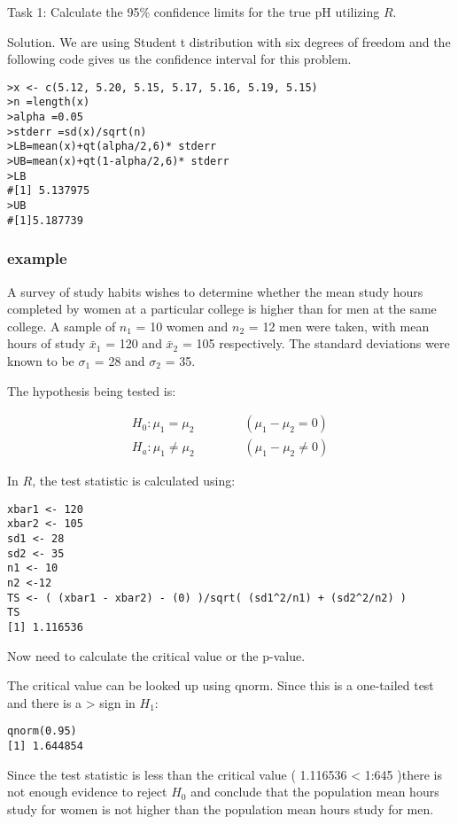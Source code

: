 Task 1: Calculate the 95\% confidence limits for the true pH
utilizing $R$.


Solution. We are using Student t distribution with six degrees of
freedom and the following code gives us the confidence interval
for this problem.
\begin{verbatim}
>x <- c(5.12, 5.20, 5.15, 5.17, 5.16, 5.19, 5.15)
>n =length(x)
>alpha =0.05
>stderr =sd(x)/sqrt(n)
>LB=mean(x)+qt(alpha/2,6)* stderr
>UB=mean(x)+qt(1-alpha/2,6)* stderr
>LB
#[1] 5.137975
>UB
#[1]5.187739
\end{verbatim}


\subsubsection{example}
A survey of study habits wishes to determine whether the mean
study hours completed by women at a particular college is higher
than for men at the same college. A sample of $n_1$ = 10 women and
$n_2$ = 12 men were taken, with mean hours of study $\bar{x}_1$ =
120 and $\bar{x}_2$ = 105 respectively. The standard deviations
were known to be $\sigma_1$ = 28 and $\sigma_2$ = 35.

The hypothesis being tested is:

\begin{eqnarray}
H_{0}: \mu_1 = \mu_2\qquad \qquad (\mu_1 - \mu_2= 0)\\
H_{a}: \mu_1 \neq \mu_2 \qquad \qquad (\mu_1 - \mu_2 \neq 0)
\end{eqnarray}

In $R$, the test statistic is calculated using:

\begin{verbatim}
xbar1 <- 120
xbar2 <- 105
sd1 <- 28
sd2 <- 35
n1 <- 10
n2 <-12
TS <- ( (xbar1 - xbar2) - (0) )/sqrt( (sd1^2/n1) + (sd2^2/n2) )
TS
[1] 1.116536
\end{verbatim}
Now need to calculate the critical value or the p-value.


The critical value can be looked up using qnorm. Since this is a
one-tailed test and there is a > sign in $H_1$:

\begin{verbatim}
qnorm(0.95)
[1] 1.644854
\end{verbatim}

Since the test statistic is less than the critical value ( 1.116536 < 1:645 )there is not enough evidence to reject $H_0$
and conclude that the population mean hours study for women is
not higher than the population mean hours study for men.


